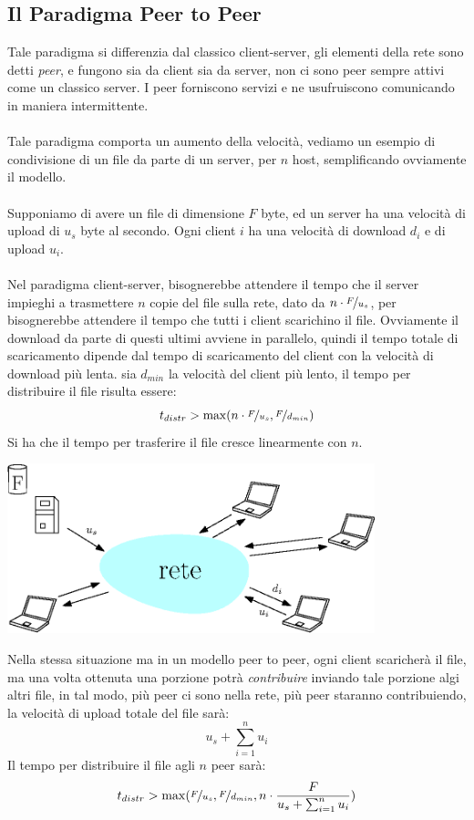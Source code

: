 \documentclass[12pt, letterpaper]{article}
\newcommand{\acc}{\\\hphantom{}\\}
\begin{document}
\subsection{Il Paradigma Peer to Peer}
Tale paradigma si differenzia dal classico client-server, gli elementi della rete sono detti \textit{peer},
e fungono sia da client sia da server, non ci sono peer sempre attivi come un classico server. I peer forniscono 
servizi e ne usufruiscono comunicando in maniera intermittente.\acc 
Tale paradigma comporta un aumento della velocità, vediamo un esempio di condivisione di un file da
parte di un server, per $n$ host, semplificando ovviamente il modello. \acc 
Supponiamo di avere un file di dimensione $F$ byte, ed un server ha una velocità di upload di $u_s$ byte 
al secondo. Ogni client $i$ ha una velocità di download $d_i$ e di upload  $u_i$.\acc 
Nel paradigma client-server, bisognerebbe attendere il tempo che il server impieghi a trasmettere $n$ 
copie del file 
sulla rete, dato da $n\cdot\nicefrac{ F}{u_s}$, per bisognerebbe attendere il tempo che tutti i client scarichino il 
file. Ovviamente il download da parte di questi ultimi avviene in parallelo, quindi il tempo totale di scaricamento 
dipende dal tempo di scaricamento del client con la velocità di download più lenta. sia $d_{min}$ la velocità 
del client più lento, il tempo per distribuire il file risulta essere:
$$t_{distr}>\max(n\cdot\nicefrac{ F}{u_s},\nicefrac{F}{d_{min}} )$$
Si ha che il tempo per trasferire il file cresce linearmente con $n$.
\begin{center}
    \includegraphics[width=0.8\textwidth ]{images/nFile.eps}
\end{center}
Nella stessa situazione ma in un modello peer to peer, ogni client scaricherà il file, ma 
una volta ottenuta una porzione potrà \textit{contribuire} inviando tale porzione algi altri file, in tal modo, 
più peer ci sono nella rete, più peer staranno contribuiendo, la velocità di upload totale del file 
sarà: $$\displaystyle u_s +\sum_{i=1}^n u_i$$
Il tempo per distribuire il file agli $n$ peer sarà:$$
t_{distr}>\max(\nicefrac{ F}{u_s},\nicefrac{ F}{d_{min}},n\cdot \dfrac{F}{u_s +\sum_{i=1}^n u_i})
$$
\end{document}
